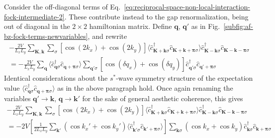 Consider the off-diagonal terms of Eq.~\eqref{eq:reciprocal-space-non-local-interaction-fock-intermediate-2}. These contribute instead to the gap renormalization, being out of diagonal in the $2\times2$ hamiltonian matrix. Define $\mathbf{q}$, $\mathbf{q}'$ as in Fig.~\ref{subfig:af-bz-fock-terms-newvariables}, and rewrite
\begin{multline*}
	-\frac{2V}{L_x L_y} \sum_{\mathbf{K}, \mathbf{k}} \sum_\sigma \left[
		\cos \left(
			2k_x
		\right)	+ \cos \left(
			2k_y
		\right)	
	\right]
	\langle
		\hat c_{\mathbf{K}+\mathbf{k} \sigma}^\dagger 
		\hat 	c_{\mathbf{K}+\mathbf{k}+\bm{\pi} \sigma}
	\rangle
	\hat c_{\mathbf{K}-\mathbf{k} \sigma}^\dagger  \hat c_{\mathbf{K}-\mathbf{k}-\bm{\pi}\sigma} \\
	= -\frac{2V}{L_xL_y} \sum_{\mathbf{q}} \langle
		\hat c_{\mathbf{q}\sigma}^\dagger 
		\hat c_{\mathbf{q}+\bm{\pi}\sigma}
	\rangle \sum_{\mathbf{q}'\sigma} \left[
		\cos \left(
			\delta q_x
		\right)	+ \cos \left(
			\delta q_y
		\right)	
	\right] \hat c_{\mathbf{q}'\sigma}^\dagger  \hat c_{\mathbf{q}'+\bm{\pi}\sigma}
\end{multline*}
Identical considerations about the $s^*$-wave symmetry structure of the expectation value $\langle \hat c_{\mathbf{q}\sigma}^\dagger \hat c_{\mathbf{q}+\bm{\pi}\sigma} \rangle$ as in the above paragraph hold. Once again renaming the variables $\mathbf{q}'\to\mathbf{k}$, $\mathbf{q}\to\mathbf{k}'$ for the sake of general aesthetic coherence, this gives
\begin{multline}
	-\frac{2V}{L_x L_y} \sum_{\mathbf{K}, \mathbf{k}} \sum_\sigma \left[
		\cos \left(
			2k_x
		\right)	+ \cos \left(
			2k_y
		\right)	
	\right]
	\langle
		\hat c_{\mathbf{K}+\mathbf{k} \sigma}^\dagger 
		\hat 	c_{\mathbf{K}+\mathbf{k}+\bm{\pi} \sigma}
	\rangle
	\hat c_{\mathbf{K}-\mathbf{k} \sigma}^\dagger  \hat c_{\mathbf{K}-\mathbf{k}-\bm{\pi}\sigma} \\
	= -2V \left[
		\frac{1}{2L_xL_y} \sum_{\mathbf{k}'}
		\left(
			\cos k_x' + \cos k_y'
		\right) \langle
			\hat c_{\mathbf{k}'\sigma}^\dagger  \hat c_{\mathbf{k}'+\bm{\pi}\sigma}
		\rangle
	\right]
	\sum_{\mathbf{k}\sigma} \left(
		\cos k_x + \cos	k_y	
	\right)
	\hat c_{\mathbf{k}\sigma}^\dagger  \hat c_{\mathbf{k}+\bm{\pi}\sigma}
\end{multline}


